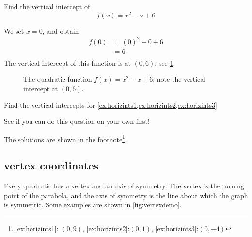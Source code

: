 \begin{myexample}
Find the vertical intercept of
\[
	f(x) = x^2-x+6
\]
{}
\end{myexample}
\begin{myProof}
	We set $x=0$, and obtain
	\begin{align*}
		f(0) & =   (0)^2-0+6 \\
		     & =  6          \\
	\end{align*} 
	The vertical intercept of this function is at $(0,6)$; see \cref{fig:quad3}.
	\begin{figure}[!ht]
		\centering
		\caption{The quadratic function $f(x)=x^2-x+6$; note the vertical intercept at $(0,6)$. }
		\label{fig:quad3}
	\end{figure}
	\FloatBarrier
			
\end{myProof} 

\begin{myexample}
Find the vertical intercepts for \cref{ex:horizints1,ex:horizints2,ex:horizints3}
\end{myexample}
\begin{myProof}
	See if you can do this question on your own first! 
			
	The solutions are shown in the footnote\footnote{\cref{ex:horizints1}: $(0,9)$, \cref{ex:horizints2}:$(0,1)$, \cref{ex:horizints3}:$(0,-4)$}. 
\end{myProof}


\subsection{\Gls{vertex} coordinates}
Every quadratic has a vertex and an axis of symmetry. The vertex is the turning point of the parabola, and the axis of symmetry
is the line about which the graph is symmetric. Some examples are shown in \cref{fig:vertexdemo}.

